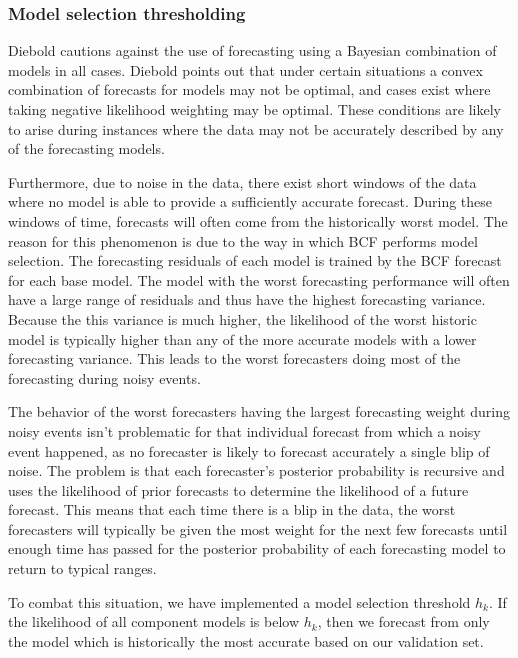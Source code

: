 \subsubsection{Model selection thresholding}
Diebold \cite{Diebold1991} cautions against the use of forecasting using a Bayesian combination of models in all cases.  Diebold points out that under certain situations a convex combination of forecasts for models may not be optimal, and cases exist where taking negative likelihood weighting may be optimal.  These conditions are likely to arise during instances where the data may not be accurately described by any of the forecasting models.  

Furthermore, due to noise in the data, there exist short windows of the data where no model is able to provide a sufficiently accurate forecast.  During these windows of time, forecasts will often come from the historically worst model.  The reason for this phenomenon is due to the way in which BCF performs model selection.  The forecasting residuals of each model is trained by the BCF forecast for each base model.  The model with the worst forecasting performance will often have a large range of residuals and thus have the highest forecasting variance.  Because the this variance is much higher, the likelihood of the worst historic model is typically higher than any of the more accurate models with a  lower forecasting variance.  This leads to the worst forecasters doing most of the forecasting during noisy events.  

The behavior of the worst forecasters having the largest forecasting weight during noisy events isn't problematic for that individual forecast from which a noisy event happened, as no forecaster is likely to forecast accurately a single blip of noise.  The problem is that each forecaster's posterior probability is recursive and uses the likelihood of prior forecasts to determine the likelihood of a future forecast.  This means that each time there is a blip in the data, the worst forecasters will typically be given the most weight for the next few forecasts until enough time has passed for the posterior probability of each forecasting model to return to typical ranges.

To combat this situation, we have implemented a model selection threshold $h_{k}$.  If the likelihood of all component models is below $h_{k}$, then we forecast from only the model which is historically the most accurate based on our validation set.  


